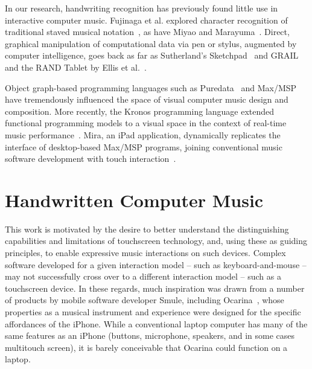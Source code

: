 \documentclass{nime-alternate}
\begin{document}
In our research, handwriting recognition has previously found little use in interactive computer music. 
Fujinaga et al. explored character recognition of traditional staved musical notation~\cite{fujinaga1989computer, fujinaga1996exemplar}, as have Miyao and Marayuma~\cite{miyao2007online}. 
Direct, graphical manipulation of computational data via pen or stylus, augmented by computer intelligence, goes back as far as Sutherland's Sketchpad~\cite{sutherland1964sketch} and GRAIL and the RAND Tablet by Ellis et al.~\cite{davis1964rand}. 

Object graph-based programming languages such as Puredata~\cite{puckette1996pure} and Max/MSP~\cite{zicarelli1998extensible} have tremendously influenced the space of visual computer music design and composition. 
More recently, the Kronos programming language extended functional programming models to a visual space in the context of real-time music performance~\cite{norilo2012visualization}. 
Mira, an iPad application, dynamically replicates the interface of desktop-based Max/MSP programs, joining conventional music software development with touch interaction~\cite{tarakajian2013anmira}. 


%
%

\section{Handwritten Computer Music}
\label{sec:HandwrittenComputerMusic}

This work is motivated by the desire to better understand the distinguishing capabilities and limitations of touchscreen technology, and, using these as guiding principles, to enable expressive music interactions on such devices. 
Complex software developed for a given interaction model -- such as keyboard-and-mouse -- may not successfully cross over to a different interaction model -- such as a touchscreen device. 
In these regards, much inspiration was drawn from a number of products by mobile software developer Smule, including Ocarina~\cite{wang2014ocarina}, whose properties as a musical instrument and experience were designed for the specific affordances of the iPhone. 
While a conventional laptop computer has many of the same features as an iPhone (buttons, microphone, speakers, and in some cases multitouch screen), it is barely conceivable that Ocarina could function on a laptop.
\end{document}
